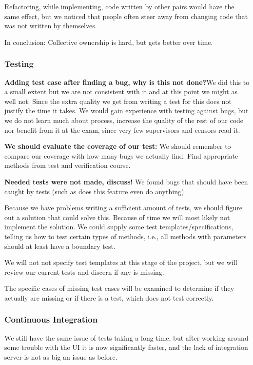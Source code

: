 Refactoring, while implementing, code written by other pairs would have the same effect, but we noticed that people often steer away from changing code that was not written by themselves.

In conclusion: Collective ownership is hard, but gets better over time.

\subsubsection{Testing}
\textbf{Adding test case after finding a bug, why is this not done?}We did this to a small extent but we are not consistent with it and at this point we might as well not. Since the extra quality we get from writing a test for this does not justify the time it takes. We would gain experience with testing against bugs, but we do not learn much about process, increase the quality of the rest of our code nor benefit from it at the exam, since very few supervisors and censors read it.

\textbf{We should evaluate the coverage of our test:}
We should remember to compare our coverage with how many bugs we actually find.
Find appropriate methods from test and verification course.

\textbf{Needed tests were not made, discuss!}
We found bugs that should have been caught by tests (such as does this feature even do anything) 

Because we have problems writing a sufficient amount of tests, we should figure out a solution that could solve this. Because of time we will most likely not implement the solution. We could supply some test templates/specifications, telling us how to test certain types of methods, i.e., all methods with parameters should at least have a boundary test.

We will not not specify test templates at this stage of the project, but we will review our current tests and discern if any is missing.

The specific cases of missing test cases will be examined to determine if they actually are missing or if there is a test, which does not test correctly.


\subsubsection{Continuous Integration}
We still have the same issue of tests taking a long time, but after working around some trouble with the UI it is now significantly faster, and the lack of integration server is not as big an issue as before.
